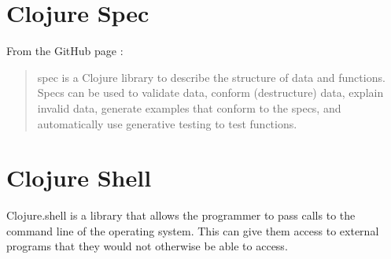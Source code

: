 \section{Clojure Spec}
\label{appendix:clojure-spec}
From the GitHub page \citep{Hickey2018}:

\begin{quote}
  spec is a Clojure library to describe the structure of data and functions.
  Specs can be used to validate data, conform (destructure) data, explain
  invalid data, generate examples that conform to the specs, and automatically
  use generative testing to test functions.
\end{quote}

\section{Clojure Shell}
\label{appendix:clojure-shell}
Clojure.shell is a library that allows the programmer to pass calls to the
command line of the operating system. This can give them access to external
programs that they would not otherwise be able to access.

